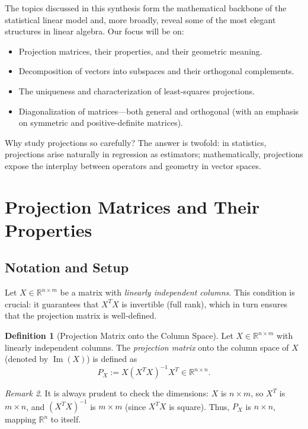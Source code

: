\documentclass[12pt]{article}
\theoremstyle{definition}
\newtheorem{definition}{Definition}[section]
\theoremstyle{plain}
\theoremstyle{remark}
\newtheorem{remark}[definition]{Remark}
\begin{document}
The topics discussed in this synthesis form the mathematical backbone of the statistical linear model and, more broadly, reveal some of the most elegant structures in linear algebra. Our focus will be on:

\begin{itemize}
    \item Projection matrices, their properties, and their geometric meaning.
    \item Decomposition of vectors into subspaces and their orthogonal complements.
    \item The uniqueness and characterization of least-squares projections.
    \item Diagonalization of matrices---both general and orthogonal (with an emphasis on symmetric and positive-definite matrices).
\end{itemize}

Why study projections so carefully? The answer is twofold: in statistics, projections arise naturally in regression as estimators; mathematically, projections expose the interplay between operators and geometry in vector spaces.

\section{Projection Matrices and Their Properties}

\subsection{Notation and Setup}

Let $X \in \mathbb{R}^{n \times m}$ be a matrix with \emph{linearly independent columns}. This condition is crucial: it guarantees that $X^T X$ is invertible (full rank), which in turn ensures that the projection matrix is well-defined.

\begin{definition}[Projection Matrix onto the Column Space]
    Let $X \in \mathbb{R}^{n \times m}$ with linearly independent columns. The \emph{projection matrix} onto the column space of $X$ (denoted by $\operatorname{Im}(X)$) is defined as
    \[
        P_X := X (X^T X)^{-1} X^T \in \mathbb{R}^{n \times n}.
    \]
\end{definition}

\begin{remark}
    It is always prudent to check the dimensions: $X$ is $n \times m$, so $X^T$ is $m \times n$, and $(X^T X)^{-1}$ is $m \times m$ (since $X^T X$ is square). Thus, $P_X$ is $n \times n$, mapping $\mathbb{R}^n$ to itself.
\end{remark}
\end{document}
